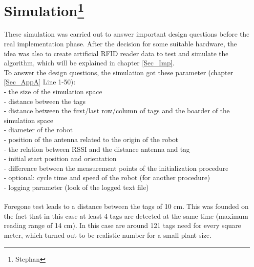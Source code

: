 \section[Simulation]{Simulation\footnote{Stephan}}
These simulation was carried out to answer important design questions before the real implementation phase. After the decision for some suitable hardware, the idea was also to create artificial RFID reader data to test and simulate the algorithm, which will be explained in chapter \ref{Sec_Imp}. \\
To answer the design questions, the simulation got these parameter (chapter \ref{Sec_AppA} Line 1-50):\\
- the size of the simulation space\\
- distance between the tags\\
- distance between the first/last row/column of tags and the boarder of the simulation space\\
- diameter of the robot\\
- position of the antenna related to the origin of the robot\\
- the relation between RSSI and the distance antenna and tag\\
- initial start position and orientation\\
- difference between the measurement points of the initialization procedure\\
- optional: cycle time and speed of the robot (for another procedure)\\
- logging parameter (look of the logged text file)\\
\\
Foregone test leads to a distance between the tags of 10 cm. This was founded on the fact that in this case at least 4 tags are detected at the same time (maximum reading range of 14 cm). In this case are around 121 tags need for every square meter, which turned out to be realistic number for a small plant size. \\

